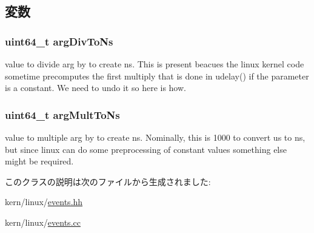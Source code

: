 \subsection{変数}
\hypertarget{classLinux_1_1UDelayEvent_a53a99750094ff662ba0e0ce44b16879d}{
\subsubsection[{argDivToNs}]{\setlength{\rightskip}{0pt plus 5cm}uint64\_\-t argDivToNs}}
\label{classLinux_1_1UDelayEvent_a53a99750094ff662ba0e0ce44b16879d}
value to divide arg by to create ns. This is present beacues the linux kernel code sometime precomputes the first multiply that is done in udelay() if the parameter is a constant. We need to undo it so here is how. \hypertarget{classLinux_1_1UDelayEvent_a5a6e4a5afa3827ac67897e3e2ca27291}{
\subsubsection[{argMultToNs}]{\setlength{\rightskip}{0pt plus 5cm}uint64\_\-t argMultToNs}}
\label{classLinux_1_1UDelayEvent_a5a6e4a5afa3827ac67897e3e2ca27291}
value to multiple arg by to create ns. Nominally, this is 1000 to convert us to ns, but since linux can do some preprocessing of constant values something else might be required. 

このクラスの説明は次のファイルから生成されました:\begin{DoxyCompactItemize}
\item 
kern/linux/\hyperlink{events_8hh}{events.hh}\item 
kern/linux/\hyperlink{events_8cc}{events.cc}\end{DoxyCompactItemize}
